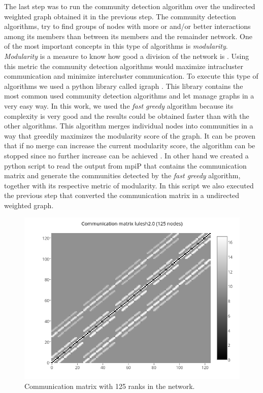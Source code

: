 \documentclass[journal]{IEEEtran}
\begin{document}
\begin{NoHyper}
The last step was to run the community detection algorithm over the undirected weighted graph obtained it in the previous step. The community detection algorithms, try to find groups of nodes with more or and/or better interactions among its members than between its members and the remainder network. One of the most important concepts in this type of algorithms is \textit{modularity}. \textit{Modularity} is a measure to know how good a division of the network is \cite{NewGir04}. Using this metric the community detection algorithms would maximize intracluster communication and minimize intercluster communication. To execute this type of algorithms we used a python library called igraph \cite{igraph}. This library contains the most common used community detection algorithms and let manage graphs in a very easy way. In this work, we used the \textit{fast greedy} algorithm because its complexity is very good and the results could be obtained faster than with the other algorithms. This algorithm merges individual nodes into communities in a way that greedily maximizes the modularity score of the graph. It can be proven that if no merge can increase the current modularity score, the algorithm can be stopped since no further increase can be achieved \cite{Clauset}. In other hand we created a python script to read the output from mpiP that contains the communication matrix and generate the communities detected by the \textit{fast greedy} algorithm, together with its respective metric of modularity. In this script we also executed the previous step that converted the communication matrix in a undirected weighted graph.

\begin{figure}[h!]
\includegraphics[scale=0.4]{cm_lulesh2_125}
\caption{Communication matrix with 125 ranks in the network.}
\label{fig:1}
\end{figure}


\end{NoHyper}
\end{document}
